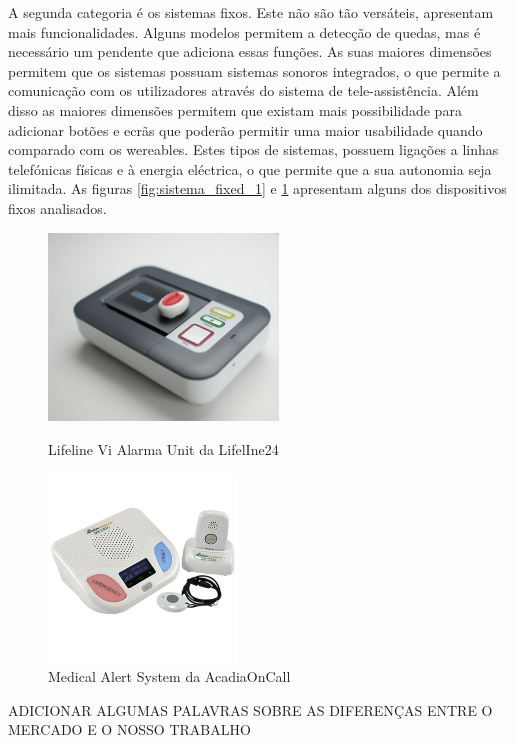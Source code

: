 A segunda categoria é os sistemas fixos. Este não são tão versáteis, apresentam mais funcionalidades. Alguns modelos permitem a detecção de quedas, mas é necessário um pendente que adiciona essas funções. As suas maiores dimensões permitem que os sistemas possuam sistemas sonoros integrados, o que permite a comunicação com os utilizadores através do sistema de tele-assistência. Além disso as maiores dimensões permitem que existam mais possibilidade para adicionar botões e ecrãs que poderão permitir uma maior usabilidade quando comparado com os wereables. Estes tipos de sistemas, possuem ligações a linhas telefónicas físicas e à energia eléctrica, o que permite que a sua autonomia seja ilimitada.
As figuras \ref{fig:sistema_fixed_1} e \ref{fig:sistema_fixed_2} apresentam alguns dos dispositivos fixos analisados.
\vspace*{-9cm}
\begin{figure}[!htb]
	\centering
	\begin{minipage}[b]{0.45\textwidth}\centering
		\includegraphics[height=5cm]{figuras/Sistemas_Lifeline.png}
		\caption{Lifeline Vi Alarma Unit da LifelIne24}
		\label{fig:sistema_fixed_1}
	\end{minipage}
	\hfill
	\begin{minipage}[b]{0.45\textwidth}\centering
		\includegraphics[height=5cm]{figuras/sistemas_Medical_Alert_System.png}
		\caption{Medical Alert System da AcadiaOnCall}
		\label{fig:sistema_fixed_2}
	\end{minipage}
\end{figure}

ADICIONAR ALGUMAS PALAVRAS SOBRE AS DIFERENÇAS ENTRE O MERCADO E O NOSSO TRABALHO

\pagebreak